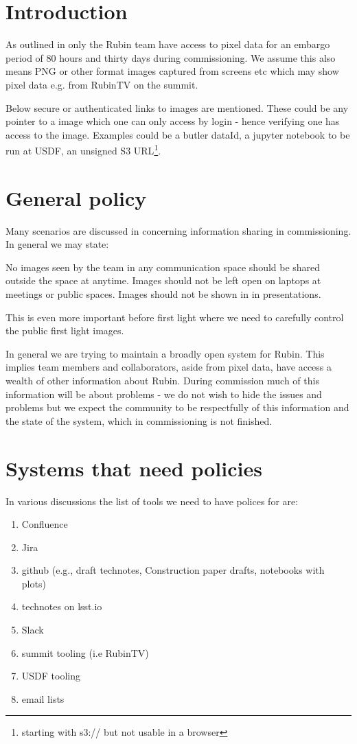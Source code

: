 
\section{Introduction}
As outlined in  only the Rubin team have access to pixel data for an embargo period of 80 hours and thirty days during commissioning. We assume this also means PNG or other format images captured from screens etc which may show pixel data e.g. from RubinTV on the summit.

Below secure or authenticated links to images are mentioned.
These could be any pointer to a image which one can only access by login - hence verifying one has access to the image. Examples could be a butler dataId, a jupyter notebook to be run at USDF, an unsigned S3 URL\footnote{starting with s3:// but not usable in a browser}.


\section{General policy} \label{sec:genpol}
Many scenarios are discussed in  concerning information sharing in commissioning.
In general we may state:

No images seen by the team in any communication space should be shared outside the space at anytime.
Images should not be left open on laptops at meetings or public spaces.
Images should not be shown in in presentations.


This is even more important before first light where we need to carefully control the public first light images.

In general we are trying to maintain a broadly open system for Rubin.
This implies team members and collaborators, aside from pixel data, have access a wealth of other information about Rubin.
During commission much of this information will be about problems - we do not wish to hide the issues and problems but
we expect the community to be respectfully of this information and the state of the system, which in commissioning is not finished.

\section {Systems that need policies}
In various discussions the list of tools we need to have polices for are:

\begin{enumerate}
    \item Confluence
    \item Jira
    \item github (e.g., draft technotes, Construction paper drafts, notebooks with plots)
    \item technotes on lsst.io
    \item Slack
    \item summit tooling (i.e RubinTV)
    \item USDF tooling
    \item email lists
\end{enumerate}

